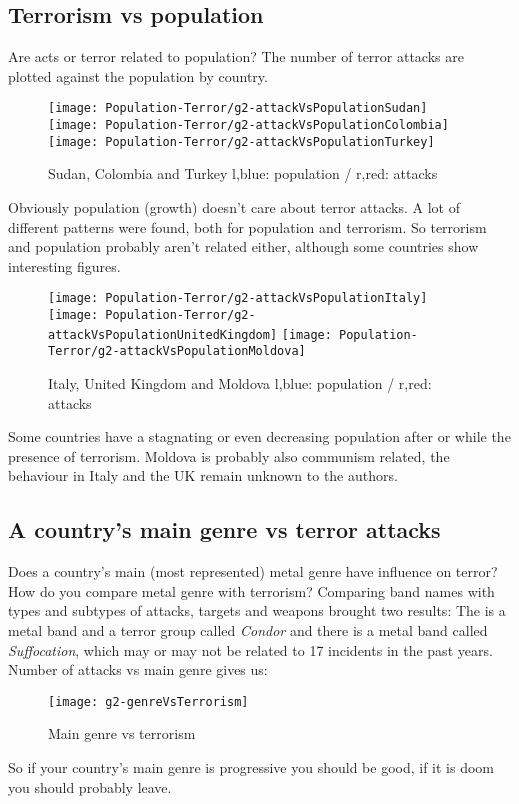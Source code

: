 \subsection{Terrorism vs population}
Are acts or terror related to population? The number of terror attacks are plotted against the population by country.
\begin{figure}[hbt!]
	\texttt{[image: Population-Terror/g2-attackVsPopulationSudan]}
	\centering
	\texttt{[image: Population-Terror/g2-attackVsPopulationColombia]}
	\texttt{[image: Population-Terror/g2-attackVsPopulationTurkey]}
	\caption{Sudan, Colombia and Turkey l,blue: population / r,red: attacks}
\end{figure}
Obviously population (growth) doesn't care about terror attacks. A lot of different patterns were found, both for population and terrorism. So terrorism and population probably aren't related either, although some countries show interesting figures.
\begin{figure}[hbt!]
	\texttt{[image: Population-Terror/g2-attackVsPopulationItaly]}
	\centering
	\texttt{[image: Population-Terror/g2-attackVsPopulationUnitedKingdom]}
	\texttt{[image: Population-Terror/g2-attackVsPopulationMoldova]}
	\caption{Italy, United Kingdom and Moldova l,blue: population / r,red: attacks}
\end{figure}
Some countries have a stagnating or even decreasing population after or while the presence of terrorism. Moldova is probably also communism related, the behaviour in Italy and the UK remain unknown to the authors.


\subsection{A country's main genre vs terror attacks}
Does a country's main (most represented) metal genre have influence on terror?
How do you compare metal genre with terrorism? Comparing band names with types and subtypes of attacks, targets and weapons brought two results: The is a metal band and a terror group called \emph{Condor} and there is a metal band called \emph{Suffocation}, which may or may not be related to 17 incidents in the past years. Number of attacks vs main genre gives us:
\begin{figure}[hbt!]
	\centering
	\texttt{[image: g2-genreVsTerrorism]}
	\caption{Main genre vs terrorism}
\end{figure}
So if your country's main genre is progressive you should be good, if it is doom you should probably leave.


